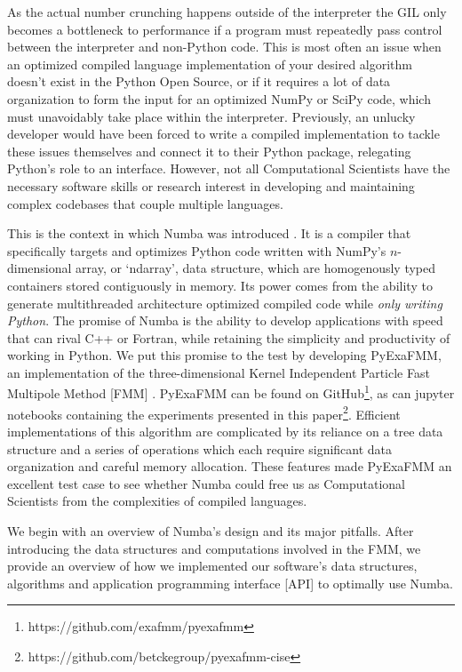 \documentclass{IEEEcsmag}
\begin{document}
As the actual number crunching happens outside of the interpreter the GIL only becomes a bottleneck to performance if a program must repeatedly pass control between the interpreter and non-Python code. This is most often an issue when an optimized compiled language implementation of your desired algorithm doesn't exist in the Python Open Source, or if it requires a lot of data organization to form the input for an optimized NumPy or SciPy code, which must unavoidably take place within the interpreter. Previously, an unlucky developer would have been forced to write a compiled implementation to tackle these issues themselves and connect it to their Python package, relegating Python's role to an interface. However, not all Computational Scientists have the necessary software skills or research interest in developing and maintaining complex codebases that couple multiple languages.

This is the context in which Numba was introduced \cite{Lam2015}. It is a compiler that specifically targets and optimizes Python code written with NumPy's $n$-dimensional array, or `ndarray', data structure, which are homogenously typed containers stored contiguously in memory. Its power comes from the ability to generate multithreaded architecture optimized compiled code while \textit{only writing Python}. The promise of Numba is the ability to develop applications with speed that can rival C++ or Fortran, while retaining the simplicity and productivity of working in Python. We put this promise to the test by developing PyExaFMM, an implementation of the three-dimensional Kernel Independent Particle Fast Multipole Method [FMM] \cite{Ying2004,Greengard1987}. PyExaFMM can be found on GitHub\footnote{https://github.com/exafmm/pyexafmm}, as can jupyter notebooks containing the experiments presented in this paper\footnote{https://github.com/betckegroup/pyexafmm-cise}. Efficient implementations of this algorithm are complicated by its reliance on a tree data structure and a series of operations which each require significant data organization and careful memory allocation. These features made PyExaFMM an excellent test case to see whether Numba could free us as Computational Scientists from the complexities of compiled languages.

We begin with an overview of Numba's design and its major pitfalls. After introducing the data structures and computations involved in the FMM, we provide an overview of how we implemented our software's data structures, algorithms and application programming interface [API] to optimally use Numba.
\end{document}
